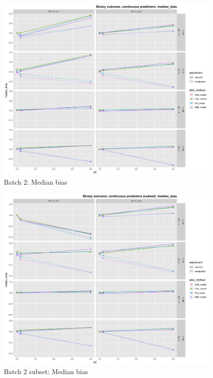 \begin{figure}[H]
	\includegraphics[width=\linewidth]{figures/b2_median_bias_all_methods_adj_unadj}
	\caption{Batch 2: Median bias}
	\label{fig:b2mb}
\end{figure}

\begin{figure}[H]
	\includegraphics[width=\linewidth]{figures/b2_sub_median_bias_all_methods_adj_unadj}
	\caption{Batch 2 subset: Median bias}
	\label{fig:b2smb}
\end{figure}


